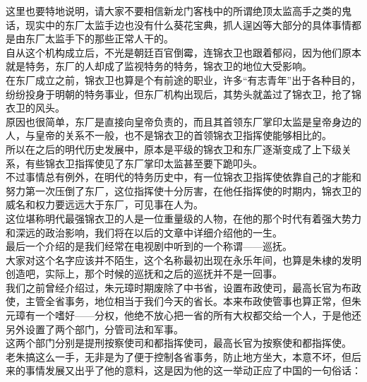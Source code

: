 \begin{multicols}{\theparacolNo}
这里也要特地说明，请大家不要相信新龙门客栈中的所谓绝顶太监高手之类的鬼话，现实中的东厂太监手边也没有什么葵花宝典，抓人逞凶等大部分的具体事情都是由东厂太监手下的那些正常人干的。\\

自从这个机构成立后，不光是朝廷百官倒霉，连锦衣卫也跟着郁闷，因为他们原本就是特务，东厂的人却成了监视特务的特务，锦衣卫的地位大受影响。\\

在东厂成立之前，锦衣卫也算是个有前途的职业，许多“有志青年”出于各种目的，纷纷投身于明朝的特务事业，但东厂机构出现后，其势头就盖过了锦衣卫，抢了锦衣卫的风头。\\

原因也很简单，东厂是直接向皇帝负责的，而且其首领东厂掌印太监是皇帝身边的人，与皇帝的关系不一般，也不是锦衣卫的首领锦衣卫指挥使能够相比的。\\

所以在之后的明代历史发展中，原本是平级的锦衣卫和东厂逐渐变成了上下级关系，有些锦衣卫指挥使见了东厂掌印太监甚至要下跪叩头。\\

不过事情总有例外，在明代的特务历史中，有一位锦衣卫指挥使依靠自己的才能和努力第一次压倒了东厂，这位指挥使十分厉害，在他任指挥使的时期内，锦衣卫的威名和权力要远远大于东厂，可见事在人为。\\

这位堪称明代最强锦衣卫的人是一位重量级的人物，在他的那个时代有着强大势力和深远的政治影响，我们将在以后的文章中详细介绍他的一生。\\

最后一个介绍的是我们经常在电视剧中听到的一个称谓——巡抚。\\

大家对这个名字应该并不陌生，这个名称最初出现在永乐年间，也算是朱棣的发明创造吧，实际上，那个时候的巡抚和之后的巡抚并不是一回事。\\

我们之前曾经介绍过，朱元璋时期废除了中书省，设置布政使司，最高长官为布政使，主管全省事务，地位相当于我们今天的省长。本来布政使管事也算正常，但朱元璋有一个嗜好——分权，他绝不放心把一省的所有大权都交给一个人，于是他还另外设置了两个部门，分管司法和军事。\\

这两个部门分别是提刑按察使司和都指挥使司，最高长官为按察使和都指挥使。\\

老朱搞这么一手，无非是为了便于控制各省事务，防止地方坐大，本意不坏，但后来的事情发展又出乎了他的意料，这是因为他的这一举动正应了中国的一句俗话：\\


\end{multicols}
